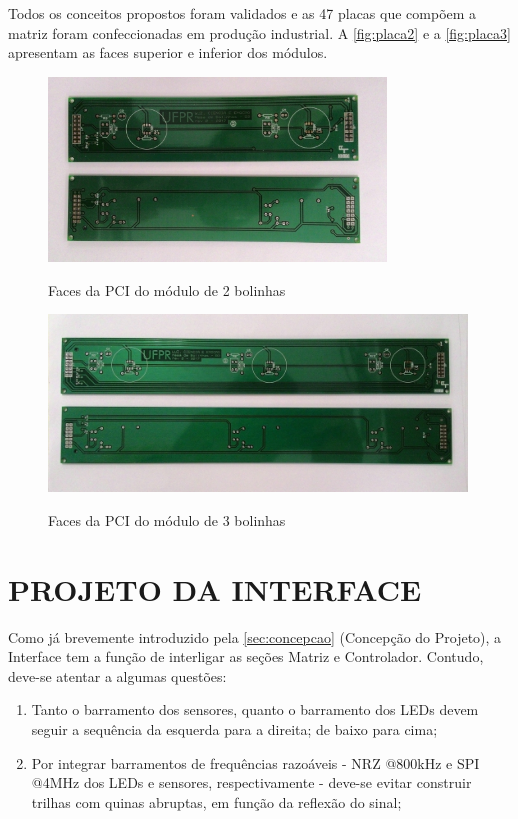 Todos os conceitos propostos foram validados e as 47 placas que compõem a matriz foram confeccionadas em produção industrial. A \autoref{fig:placa2} e a \autoref{fig:placa3} apresentam as faces superior e inferior dos módulos.

\begin{figure}[H]
    \centering
    \caption{Faces da PCI do módulo de 2 bolinhas}
    \includegraphics[width=0.8\textwidth]{./dados/figuras/bloco-2}
    \label{fig:placa2}
\end{figure}

\begin{figure}[H]
    \centering
    \caption{Faces da PCI do módulo de 3 bolinhas}
    \includegraphics[width=0.99\textwidth]{./dados/figuras/bloco-3}
    \label{fig:placa3}
\end{figure}

\section{PROJETO DA INTERFACE}
\label{sec:interface}

Como já brevemente introduzido pela \autoref{sec:concepcao} (Concepção do Projeto), a Interface tem a função de interligar as seções Matriz e Controlador. Contudo, deve-se atentar a algumas questões:

\begin{enumerate}[label=\Roman*.]
    \item Tanto o barramento dos sensores, quanto o barramento dos LEDs devem seguir a sequência da esquerda para a direita; de baixo para cima;
    \item Por integrar barramentos de frequências razoáveis - NRZ @800kHz e SPI @4MHz dos LEDs e sensores, respectivamente - deve-se evitar construir trilhas com quinas abruptas, em função da reflexão do sinal;
\end{enumerate}

